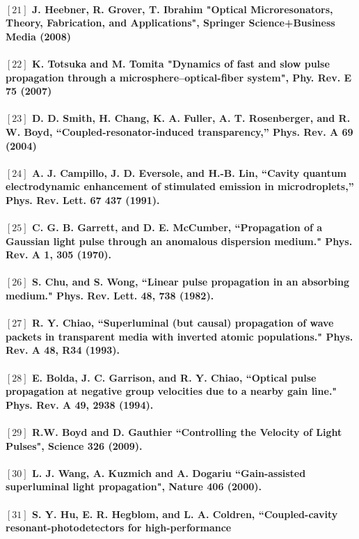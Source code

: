 \paragraph{\normalfont \large $[21]$ J. Heebner, R. Grover, T. Ibrahim "Optical Microresonators, Theory, Fabrication, and Applications", Springer Science+Business Media (2008)\\
\\ $[22]$ K. Totsuka and M. Tomita "Dynamics of fast and slow pulse propagation through a microsphere–optical-fiber system", Phy. Rev. E \textbf{75} (2007)\\
\\ $[23]$ D. D. Smith, H. Chang, K. A. Fuller, A. T. Rosenberger, and R. W. Boyd, “Coupled-resonator-induced
transparency,” Phys. Rev. A \textbf{69} (2004)\\
\\ $[24]$ A. J. Campillo, J. D. Eversole, and H.-B. Lin, “Cavity quantum electrodynamic enhancement of stimulated
emission in microdroplets,” Phys. Rev. Lett. \textbf{67} 437 (1991).\\
\\ $[25]$ C. G. B. Garrett, and D. E. McCumber,  “Propagation of a Gaussian light pulse through an anomalous dispersion medium." Phys. Rev. A \textbf{1}, 305 (1970).\\
\\ $[26]$ S. Chu, and S. Wong, “Linear pulse propagation in an absorbing medium." Phys. Rev. Lett. \textbf{48}, 738
(1982).\\
\\ $[27]$ R. Y. Chiao, “Superluminal (but causal) propagation of wave packets in transparent media with inverted atomic populations." Phys. Rev. A \textbf{48}, R34 (1993).\\
\\ $[28]$ E. Bolda, J. C. Garrison, and R. Y. Chiao, “Optical pulse propagation at negative group velocities due to a nearby gain line." Phys. Rev. A \textbf{49}, 2938 (1994).\\
\\ $[29]$ R.W. Boyd and D. Gauthier “Controlling the Velocity of Light Pulses", Science \textbf{326} (2009).\\
\\ $[30]$ L. J. Wang, A. Kuzmich and A. Dogariu “Gain-assisted superluminal light propagation", Nature \textbf{406} (2000).\\
\\ $[31]$  S. Y. Hu, E. R. Hegblom, and L. A. Coldren, “Coupled-cavity resonant-photodetectors for high-performance
}
